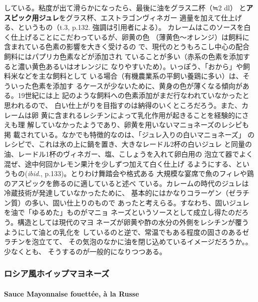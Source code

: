 \begin{recette}
{  している。粘度が出て滑らかになったら、最後に油をグラス二杯（≒2 dl）
  と\textbf{アスピック用ジュレ}をグラス\undemi{}杯、エストラゴンヴィネガー
  適量を加えて仕上げる、というもの（t.3, p.132. 強調は引用者による）。
  カレームはこのソースを白く仕上げることにこだわっているが、卵黄の色
  （薄黄色〜オレンジ）は飼料に含まれている色素の影響を大きく受けるの
  で、現代のとうもろこし中心の配合飼料にはパプリカ色素などが添加され
  ていることが多い（赤系の色素を添加すると濃い黄色あるいはオレンジに
  なりやすいため）。いっぽう、「おから」や飼料米などを主な飼料として
  いる場合（有機農業系の平飼い養鶏に多い）は、そういった色素を添加す
  るケースが少ないために、黄身の色が薄くなる傾向がある。19世紀には上
  記のような飼料への色素添加がまだ行なわれていなかったと思われるので、
  白い仕上がりを目指すのは納得のいくところだろう。また、カレームは卵
  黄に含まれるレシチンによって乳化作用が起きることを経験的にさえも理
  解していなかったようであり、卵黄を用いないマニョネーズのレシピも掲
  載されている。なかでも特徴的なのは、「ジュレ入りの白いマニョネーズ」
  のレシピで、これは氷の上に鍋を置き、大きなレードル2杯の白いジュレ
  と同量の油、レードル1杯のヴィネガー、塩、こしょうを入れて卵白用の
  泡立て器でよく混ぜ、途中何回かレモン果汁を少しずつ加えて白く仕上げ
  るようにする、というもの(\emph{ibid}.,
  p.133)。とりわけ舞踏会や格式ある
  大規模な宴席で魚のフィレや鶏のアスピックを飾るのに適していると述べ
  ている。カレームの時代のジュレは冷蔵技術が発達していなかったために、
  基本的にはかなりコラーゲン（ゼラチン質）の多い、固い仕上りのもので
  あったと考えらる。すなわち、固いジュレを油で「ゆるめた」ものがマニョ
  ネーズというソースとして成立し得たのだろう。構造としては現代のマヨ
  ネーズが卵黄や酢の水分の外側をレシチンが覆うようにして油との乳化を
  しているのと逆で、常温でもある程度の固さのあるゼラチンを泡立てて、
  その気泡のなかに油を閉じ込めているイメージだろうか。}。少なくとも、
そうするのが一般的になりつつある。

\maeaki 

\hypertarget{ux30edux30b7ux30a2ux98a8ux30dbux30a4ux30c3ux30d7ux30deux30e8ux30cdux30fcux30ba}{%
\subsubsection{ロシア風ホイップマヨネーズ}\label{ux30edux30b7ux30a2ux98a8ux30dbux30a4ux30c3ux30d7ux30deux30e8ux30cdux30fcux30ba}}

\hypertarget{mayonnaise-fouette-a-la-russe}{%
\paragraph{Sauce Mayonnaise fouettée, à la
Russe}\label{mayonnaise-fouette-a-la-russe}}


\end{recette}
